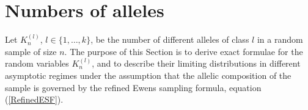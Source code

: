 \documentclass[12pt]{amsart}
\theoremstyle{definition}
\numberwithin{equation}{section}
\begin{document}
\section{Numbers of alleles}\label{SectionNumbersAllelicTypes}

Let $K_n^{(l)}$, $l\in\{1,\ldots,k\}$, be the number of different alleles of class $l$ in a random sample of size $n$.
The purpose of this Section is to derive exact formulae
for the random variables $K_n^{(l)}$, and to describe their
limiting distributions in different asymptotic regimes under the assumption that the allelic composition of the sample
is governed by the refined Ewens sampling formula, equation (\ref{RefinedESF}).
\end{document}
